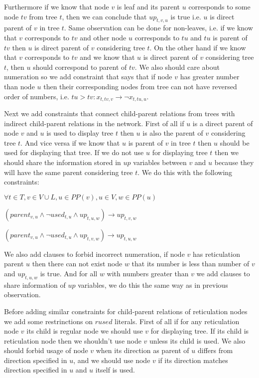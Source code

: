 \documentclass[runningheads, envcountsame, a4paper]{llncs}
\begin{document}
Furthermore if we know that node $v$ is leaf and its parent $u$ corresponds to some node $tv$ from tree $t$, 
then we can conclude that $up_{t,v,u}$ is true i.e. $u$ is direct parent of $v$ in tree $t$. Same observation 
can be done for non-leaves, i.e. if we know that $v$ corresponds to $tv$ and other node $u$ corresponds to $tu$ 
and $tu$ is parent of $tv$ then $u$ is direct parent of $v$ considering tree $t$. On the other hand if we know 
that $v$ corresponds to $tv$ and we know that $u$ is direct parent of $v$ considering tree $t$, then $u$ should 
correspond to parent of $tv$. We also should care about numeration so we add constraint that says that if node 
$v$ has greater number than node $u$ then their corresponding nodes from tree can not have reversed order of 
numbers, i.e. $tu > tv : x_{t,tv,v} \rightarrow \neg x_{t,tu,u}$.

Next we add constraints that connect child-parent relations from trees with indirect child-parent relations in 
the network. First of all if $u$ is a direct parent of node $v$ and $u$ is used to display tree $t$ then $u$ is 
also the parent of $v$ considering tree $t$. And vice versa if we know that $u$ is parent of $v$ in tree $t$ then 
$u$ should be used for displaying that tree. If we do not use $u$ for displaying tree $t$ then we should share the 
information stored in $up$ variables between $v$ and $u$ because they will have the same parent considering tree $t$. 
We do this with the following constraints:

$\forall t \in T,v \in V \cup L, u \in PP(v), u \in V, w \in PP(u)$

$(parent_{v,u} \wedge \neg used_{t,u} \wedge up_{t,u,w}) \rightarrow up_{t,v,w}$

$(parent_{v,u} \wedge \neg used_{t,u} \wedge up_{t,v,w}) \rightarrow up_{t,u,w}$

We also add clauses to forbid incorrect numeration, if node $v$ has reticulation parent $u$ then there can not 
exist node $w$ that its number is less than number of $v$ and $up_{t,u,w}$ is true. And for all $w$ with numbers 
greater than $v$ we add clauses to share information of $up$ variables, we do this the same way as in previous observation.

Before adding similar constraints for child-parent relations of reticulation nodes we add some restrinctions on
$rused$ literals. First of all if for any reticulation node $v$ its child is regular node we should use $v$ for 
displaying tree. If its child is reticulation node then we shouldn't use node $v$ unless its child is used. We 
also should forbid usage of node $v$ when its direction as parent of $u$ differs from direction specified in 
$u$, and we should use node $v$ if its direction matches direction specified in $u$ and $u$ itself is used.
\end{document}
